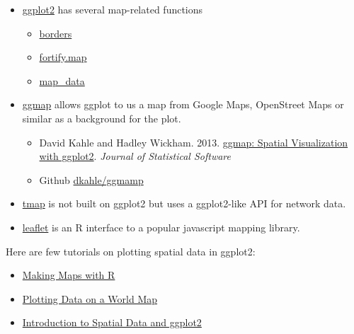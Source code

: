 \documentclass[]{book}
\providecommand{\tightlist}{%
  \setlength{\itemsep}{0pt}\setlength{\parskip}{0pt}}
\theoremstyle{definition}
\theoremstyle{definition}
\theoremstyle{definition}
\theoremstyle{remark}
\begin{document}
\begin{itemize}
\item
  \href{https://cran.r-project.org/package=ggplot2}{ggplot2} has several
  map-related functions

  \begin{itemize}
  \tightlist
  \item
    \href{http://docs.ggplot2.org/current/borders.html}{borders}
  \item
    \href{http://docs.ggplot2.org/current/fortify.map.html}{fortify.map}
  \item
    \href{http://docs.ggplot2.org/current/map_data.html}{map\_data}
  \end{itemize}
\item
  \href{https://cran.r-project.org/package=ggmap}{ggmap} allows ggplot
  to us a map from Google Maps, OpenStreet Maps or similar as a
  background for the plot.

  \begin{itemize}
  \tightlist
  \item
    David Kahle and Hadley Wickham. 2013.
    \href{https://journal.r-project.org/archive/2013-1/kahle-wickham.pdf}{ggmap:
    Spatial Visualization with ggplot2}. \emph{Journal of Statistical
    Software}
  \item
    Github \href{https://github.com/dkahle/ggmap}{dkahle/ggmamp}
  \end{itemize}
\item
  \href{https://cran.r-project.org/package=tmap}{tmap} is not built on
  ggplot2 but uses a ggplot2-like API for network data.
\item
  \href{https://cran.r-project.org/package=leaflet}{leaflet} is an R
  interface to a popular javascript mapping library.
\end{itemize}

Here are few tutorials on plotting spatial data in ggplot2:

\begin{itemize}
\tightlist
\item
  \href{http://eriqande.github.io/rep-res-web/lectures/making-maps-with-R.html}{Making
  Maps with R}
\item
  \href{https://www.r-bloggers.com/r-beginners-plotting-locations-on-to-a-world-map/}{Plotting
  Data on a World Map}
\item
  \href{https://rpubs.com/m_dev/Intro-to-Spatial-Data-and-ggplot2}{Introduction
  to Spatial Data and ggplot2}
\end{itemize}
\end{document}
